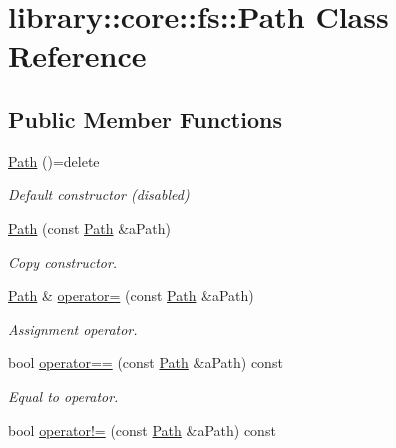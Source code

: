 \hypertarget{classlibrary_1_1core_1_1fs_1_1_path}{}\section{library\+:\+:core\+:\+:fs\+:\+:Path Class Reference}
\label{classlibrary_1_1core_1_1fs_1_1_path}
\subsection*{Public Member Functions}
\begin{DoxyCompactItemize}
\item 
\mbox{\label{classlibrary_1_1core_1_1fs_1_1_path_aaba9a8e0153813f08f78f1c3275734a4}} 
\hyperlink{classlibrary_1_1core_1_1fs_1_1_path_aaba9a8e0153813f08f78f1c3275734a4}{Path} ()=delete
\begin{DoxyCompactList}\small\item\em Default constructor (disabled) \end{DoxyCompactList}\item 
\hyperlink{classlibrary_1_1core_1_1fs_1_1_path_aabc4240fc08479d1bff6b9753f2b5cc2}{Path} (const \hyperlink{classlibrary_1_1core_1_1fs_1_1_path}{Path} \&a\+Path)
\begin{DoxyCompactList}\small\item\em Copy constructor. \end{DoxyCompactList}\item 
\hyperlink{classlibrary_1_1core_1_1fs_1_1_path}{Path} \& \hyperlink{classlibrary_1_1core_1_1fs_1_1_path_a138827134fbe96f732c5708a6a331f89}{operator=} (const \hyperlink{classlibrary_1_1core_1_1fs_1_1_path}{Path} \&a\+Path)
\begin{DoxyCompactList}\small\item\em Assignment operator. \end{DoxyCompactList}\item 
bool \hyperlink{classlibrary_1_1core_1_1fs_1_1_path_add705556eb4509ab2868e322490a1e35}{operator==} (const \hyperlink{classlibrary_1_1core_1_1fs_1_1_path}{Path} \&a\+Path) const
\begin{DoxyCompactList}\small\item\em Equal to operator. \end{DoxyCompactList}\item 
bool \hyperlink{classlibrary_1_1core_1_1fs_1_1_path_a79b3a6951753c591bab57ee41f7c4c6f}{operator!=} (const \hyperlink{classlibrary_1_1core_1_1fs_1_1_path}{Path} \&a\+Path) const

\end{DoxyCompactItemize}
